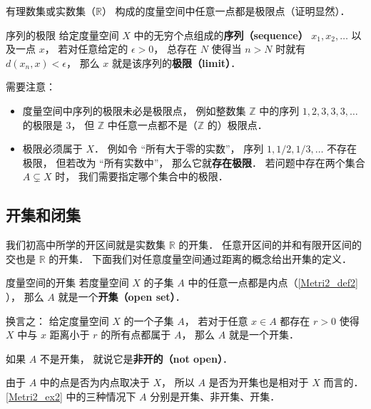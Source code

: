 \begin{example}{}\label{Metri2_ex2}
有理数集或实数集（$\mathbb R$） 构成的度量空间中任意一点都是极限点（证明显然）．
\end{example}

\begin{definition}{序列的极限}\label{Metri2_def1}
给定度量空间 $X$ 中的无穷个点组成的\textbf{序列（sequence）} $x_1, x_2, \dots$ 以及一点 $x$， 若对任意给定的 $\epsilon > 0$， 总存在 $N$ 使得当 $n > N$ 时就有 $d(x_n, x) < \epsilon$， 那么 $x$ 就是该序列的\textbf{极限（limit）}．
\end{definition}
需要注意：
\begin{itemize}
\item 度量空间中序列的极限未必是极限点， 例如整数集 $\mathbb Z$ 中的序列 $1, 2, 3, 3, 3, \dots$ 的极限是 $3$， 但 $\mathbb Z$ 中任意一点都不是（$\mathbb Z$ 的）极限点．
\item 极限必须属于 $X$． 例如令 “所有大于零的实数”， 序列 $1, 1/2, 1/3, \dots$ 不存在极限， 但若改为 “所有实数中”， 那么它就\textbf{存在极限}． 若问题中存在两个集合 $A \subsetneq X$ 时， 我们需要指定哪个集合中的极限．
\end{itemize}


\subsection{开集和闭集}
我们初高中所学的开区间就是实数集 $\mathbb R$ 的开集． 任意开区间的并和有限开区间的交也是 $\mathbb R$ 的开集． 下面我们对任意度量空间通过距离的概念给出开集的定义．

\begin{definition}{度量空间的开集}
若度量空间 $X$ 的子集 $A$ 中的任意一点都是内点（\autoref{Metri2_def2} ）， 那么 $A$ 就是一个\textbf{开集（open set）}．

换言之： 给定度量空间 $X$ 的一个子集 $A$， 若对于任意 $x \in A$ 都存在 $r > 0$ 使得 $X$ 中与 $x$ 距离小于 $r$ 的所有点都属于 $A$， 那么 $A$ 就是一个开集．

如果 $A$ 不是开集， 就说它是\textbf{非开的（not open）}．
\end{definition}
由于 $A$ 中的点是否为内点取决于 $X$， 所以 $A$ 是否为开集也是相对于 $X$ 而言的． \autoref{Metri2_ex2} 中的三种情况下 $A$ 分别是开集、非开集、开集．

